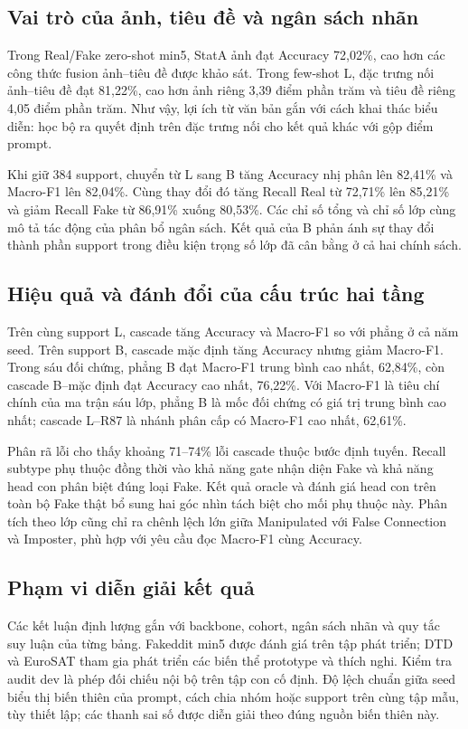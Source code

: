 \documentclass[12pt,a4paper]{article}
\numberwithin{figure}{section}
\numberwithin{table}{section}
\numberwithin{equation}{section}
\begin{document}
\subsection{Vai trò của ảnh, tiêu đề và ngân sách nhãn}
Trong Real/Fake zero-shot min5, StatA ảnh đạt Accuracy 72,02\%, cao hơn các công thức fusion ảnh--tiêu đề được khảo sát. Trong few-shot L, đặc trưng nối ảnh--tiêu đề đạt 81,22\%, cao hơn ảnh riêng 3,39 điểm phần trăm và tiêu đề riêng 4,05 điểm phần trăm. Như vậy, lợi ích từ văn bản gắn với cách khai thác biểu diễn: học bộ ra quyết định trên đặc trưng nối cho kết quả khác với gộp điểm prompt.

Khi giữ 384 support, chuyển từ L sang B tăng Accuracy nhị phân lên 82,41\% và Macro-F1 lên 82,04\%. Cùng thay đổi đó tăng Recall Real từ 72,71\% lên 85,21\% và giảm Recall Fake từ 86,91\% xuống 80,53\%. Các chỉ số tổng và chỉ số lớp cùng mô tả tác động của phân bổ ngân sách. Kết quả của B phản ánh sự thay đổi thành phần support trong điều kiện trọng số lớp đã cân bằng ở cả hai chính sách.

\subsection{Hiệu quả và đánh đổi của cấu trúc hai tầng}
Trên cùng support L, cascade tăng Accuracy và Macro-F1 so với phẳng ở cả năm seed. Trên support B, cascade mặc định tăng Accuracy nhưng giảm Macro-F1. Trong sáu đối chứng, phẳng B đạt Macro-F1 trung bình cao nhất, 62,84\%, còn cascade B--mặc định đạt Accuracy cao nhất, 76,22\%. Với Macro-F1 là tiêu chí chính của ma trận sáu lớp, phẳng B là mốc đối chứng có giá trị trung bình cao nhất; cascade L--R87 là nhánh phân cấp có Macro-F1 cao nhất, 62,61\%.

Phân rã lỗi cho thấy khoảng 71--74\% lỗi cascade thuộc bước định tuyến. Recall subtype phụ thuộc đồng thời vào khả năng gate nhận diện Fake và khả năng head con phân biệt đúng loại Fake. Kết quả oracle và đánh giá head con trên toàn bộ Fake thật bổ sung hai góc nhìn tách biệt cho mối phụ thuộc này. Phân tích theo lớp cũng chỉ ra chênh lệch lớn giữa Manipulated với False Connection và Imposter, phù hợp với yêu cầu đọc Macro-F1 cùng Accuracy.

\subsection{Phạm vi diễn giải kết quả}
Các kết luận định lượng gắn với backbone, cohort, ngân sách nhãn và quy tắc suy luận của từng bảng. Fakeddit min5 được đánh giá trên tập phát triển; DTD và EuroSAT tham gia phát triển các biến thể prototype và thích nghi. Kiểm tra audit dev là phép đối chiếu nội bộ trên tập con cố định. Độ lệch chuẩn giữa seed biểu thị biến thiên của prompt, cách chia nhóm hoặc support trên cùng tập mẫu, tùy thiết lập; các thanh sai số được diễn giải theo đúng nguồn biến thiên này.
\end{document}
